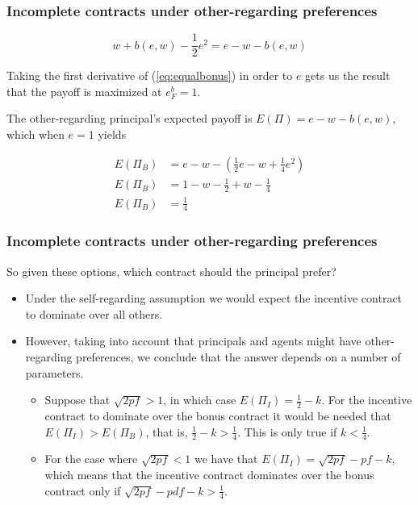 \documentclass{beamer}
\begin{document}
\begin{frame}
	\frametitle{Incomplete contracts under other-regarding preferences}
	

\begin{equation}\label{eq:equalbonus}
	w + b(e,w) - \frac{1}{2}e^2 = e - w - b(e,w)
\end{equation}

Taking the first derivative of (\ref{eq:equalbonus}) in order to $e$ gets us the result that the payoff is maximized at $e^b_F = 1$. 

The other-regarding principal's expected payoff is $E\left(\Pi\right) = e - w - b(e,w)$, which when $e=1$ yields

\begin{equation}
\begin{split}
E\left(\Pi_B\right) & = e - w - \left( \frac{1}{2}e - w + \frac{1}{4}e^2 \right)\\
E\left(\Pi_B\right)& = 1 - w - \frac{1}{2} + w - \frac{1}{4}\\
E\left(\Pi_B\right)& = \frac{1}{4} 
\end{split}
\end{equation}

\end{frame}

\begin{frame}
	\frametitle{Incomplete contracts under other-regarding preferences}
	

So given these options, which contract should the principal prefer? 

\begin{itemize}
\item Under the self-regarding assumption we would expect the incentive contract to dominate over all others. 
\item However, taking into account that principals and agents might have other-regarding preferences, we conclude that the answer depends on a number of parameters. 
\begin{itemize}
\item Suppose that $\sqrt{2pf} > 1$, in which case $E\left(\Pi_I\right) = \frac{1}{2} - k$. For the incentive contract to dominate over the bonus contract it would be needed that $E\left(\Pi_I\right) > E\left(\Pi_B\right)$, that is, $\frac{1}{2} - k > \frac{1}{4}$. This is only true if $ k < \frac{1}{4}$.
\item  For the case where $\sqrt{2pf}<1$ we have that $E\left(\Pi_I\right) = \sqrt{2pf} - pf - k$, which means that the incentive contract dominates over the bonus contract only if $\sqrt{2pf} - pdf - k >\frac{1}{4}$.
\end{itemize}
\end{itemize}
\end{frame}
\end{document}
